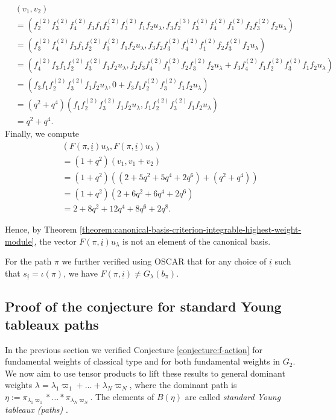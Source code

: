 \documentclass[final]{amsart}
\theoremstyle{plain}
\theoremstyle{definition}
\newcommand{\uli}{{\underline i}}
\begin{document}
\begin{align*}
    & (v_1, v_2) \\
    &= (f_2^{(2)} f_3^{(2)} f_4^{(2)} f_3 f_1 f_2^{(2)} f_3^{(2)} f_1 f_2 u_\lambda, f_3 f_2^{(3)} f_3^{(2)} f_4^{(2)} f_1^{(2)} f_2 f_3^{(2)} f_2 u_\lambda) \\
    &= (f_3^{(2)} f_4^{(2)} f_3 f_1 f_2^{(2)} f_3^{(2)} f_1 f_2 u_\lambda, f_3 f_2 f_3^{(2)} f_4^{(2)} f_1^{(2)} f_2 f_3^{(2)} f_2 u_\lambda) \\
    &= (f_4^{(2)} f_3 f_1 f_2^{(2)} f_3^{(2)} f_1 f_2 u_\lambda, f_2 f_3 f_4^{(2)} f_1^{(2)} f_2 f_3^{(2)} f_2 u_\lambda + f_3 f_4^{(2)} f_1 f_2^{(2)} f_3^{(2)} f_1 f_2 u_\lambda) \\
    &= (f_3 f_1 f_2^{(2)} f_3^{(2)} f_1 f_2 u_\lambda, 0 + f_3 f_1 f_2^{(2)} f_3^{(2)} f_1 f_2 u_\lambda) \\
    &= (q^2 + q^4) (f_1 f_2^{(2)} f_3^{(2)} f_1 f_2 u_\lambda, f_1 f_2^{(2)} f_3^{(2)} f_1 f_2 u_\lambda) \\
    &= q^2 + q^4.
\end{align*}
Finally, we compute
\begin{align*}
    & (F(\pi, \uli) u_\lambda, F(\pi, \uli) u_\lambda) \\
    &= (1+q^2) (v_1, v_1 + v_2) \\
    &= (1+q^2) ((2 + 5q^2 + 5q^4 + 2q^6) + (q^2 + q^4)) \\
    &= (1+q^2) (2 + 6q^2 + 6q^4 + 2q^6) \\
    &= 2 + 8q^2 + 12q^4 + 8q^6 + 2q^8.
\end{align*}

Hence, by Theorem \ref{theorem:canonical-basis-criterion-integrable-highest-weight-module}, the vector $F(\pi, \uli) u_\lambda$ is not an element of the canonical basis.

For the path $\pi$ we further verified using OSCAR \cite{OSCAR} that for any choice of $\uli$ such that $s_\uli = \iota(\pi)$, we have $F(\pi, \uli) \ne G_\lambda(b_\pi)$.

\subsection{Proof of the conjecture for standard Young tableaux paths}
\label{section:proof-conjecture-standard-young-tableaux-paths}

In the previous section we verified Conjecture \ref{conjecture:f-action} for fundamental weights of classical type and for both fundamental weights in $G_2$.
We now aim to use tensor products to lift these results to general dominant weights $\lambda = \lambda_1\varpi_1 + \dots + \lambda_N\varpi_N$, where the dominant path is $\eta := \pi_{\lambda_1\varpi_1} * \dots * \pi_{\lambda_N\varpi_N}$.
The elements of $B(\eta)$ are called \emph{standard Young tableaux (paths)} \cite{Littelmann:PlacticAlgebra-SemisimpleLieAlgebras}.
\end{document}
